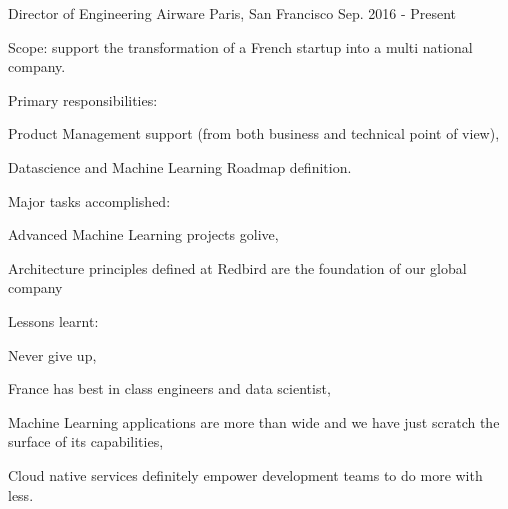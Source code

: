 

\begin{cventries}

  \cventry
    {Director of Engineering} %
    {Airware} %
    {Paris, San Francisco} %
    {Sep. 2016 - Present} %
    {
      \begin{cvitems} %
        \item {Scope: support the transformation of a French startup into a multi national company.}
        \item {Primary responsibilities:}
        \begin{cvsubitems}
          \item {Product Management support (from both business and technical point of view),}
          \item {Datascience and Machine Learning Roadmap definition.}
        \end{cvsubitems}
        \item {Major tasks accomplished:}
        \begin{cvsubitems}
          \item {Advanced Machine Learning projects golive,}
          \item {Architecture principles defined at Redbird are the foundation of our global company}
        \end{cvsubitems}
        \item {Lessons learnt:}
        \begin{cvsubitems}
          \item {Never give up,}
          \item {France has best in class engineers and data scientist,}
          \item {Machine Learning applications are more than wide and we have just scratch the surface of its capabilities,}
          \item {Cloud native services definitely empower development teams to do more with less.}
        \end{cvsubitems}
      \end{cvitems}
    }


\end{cventries}
